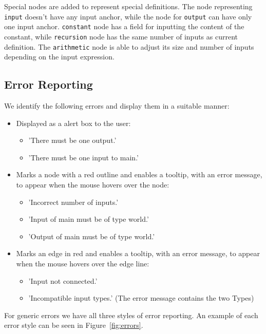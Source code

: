 \documentclass[12pt,UTF8,a4]{article}
\newcommand{\code}[1]{\texttt{#1}}
\begin{document}
Special nodes are added to represent special definitions. The node
representing \code{input} doesn't have any input anchor, while the
node for \code{output} can have only one input anchor. \code{constant}
node has a field for inputting the content of the constant, while
\code{recursion} node has the same number of inputs as current
definition. The \code{arithmetic} node is able to adjust its size and
number of inputs depending on the input expression.

\subsection{Error Reporting}

We identify the following errors and display them in a suitable manner:

\begin{itemize}
  \item Displayed as a alert box to the user:
  \begin{itemize}
    \item 'There must be one output.'
    \item 'There must be one input to main.'
  \end{itemize}
  \item Marks a node with a red outline and enables a tooltip, with an error message, to appear when the mouse hovers over the node:
  \begin{itemize}
    \item 'Incorrect number of inputs.'
    \item 'Input of main must be of type world.'
    \item 'Output of main must be of type world.'
  \end{itemize}
  \item Marks an edge in red and enables a tooltip, with an error message, to appear when the mouse hovers over the edge line:
  \begin{itemize}
    \item 'Input not connected.'
    \item 'Incompatible input types.' (The error message contains the two Types)
  \end{itemize}
\end{itemize}

For generic errors we have all three styles of error reporting. An example of each error style can be seen in Figure~\ref{fig:errors}.
\end{document}
